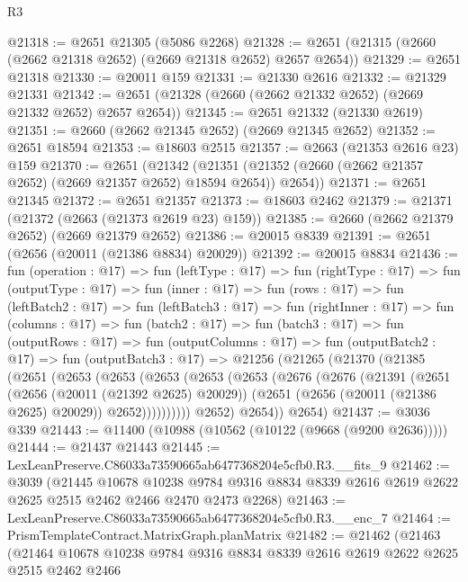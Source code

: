 \begin{lexlean}{R3}
\begin{coremodule}
@21318 := @2651 @21305 (@5086 @2268)
@21328 := @2651 (@21315 (@2660 (@2662 @21318 @2652) (@2669 @21318 @2652) @2657 @2654))
@21329 := @2651 @21318
@21330 := @20011 @159
@21331 := @21330 @2616
@21332 := @21329 @21331
@21342 := @2651 (@21328 (@2660 (@2662 @21332 @2652) (@2669 @21332 @2652) @2657 @2654))
@21345 := @2651 @21332 (@21330 @2619)
@21351 := @2660 (@2662 @21345 @2652) (@2669 @21345 @2652)
@21352 := @2651 @18594
@21353 := @18603 @2515
@21357 := @2663 (@21353 @2616 @23) @159
@21370 := @2651
    (@21342 (@21351 (@21352 (@2660 (@2662 @21357 @2652) (@2669 @21357 @2652) @18594 @2654)) @2654))
@21371 := @2651 @21345
@21372 := @2651 @21357
@21373 := @18603 @2462
@21379 := @21371 (@21372 (@2663 (@21373 @2619 @23) @159))
@21385 := @2660 (@2662 @21379 @2652) (@2669 @21379 @2652)
@21386 := @20015 @8339
@21391 := @2651 (@2656 (@20011 (@21386 @8834) @20029))
@21392 := @20015 @8834
@21436 := fun (operation : @17) =>
  fun (leftType : @17) =>
  fun (rightType : @17) =>
  fun (outputType : @17) =>
  fun (inner : @17) =>
  fun (rows : @17) =>
  fun (leftBatch2 : @17) =>
  fun (leftBatch3 : @17) =>
  fun (rightInner : @17) =>
  fun (columns : @17) =>
  fun (batch2 : @17) =>
  fun (batch3 : @17) =>
  fun (outputRows : @17) =>
  fun (outputColumns : @17) =>
  fun (outputBatch2 : @17) =>
  fun (outputBatch3 : @17) =>
  @21256
    (@21265
      (@21370
        (@21385
          (@2651
            (@2653
              (@2653
                (@2653
                  (@2653
                    (@2653
                      (@2676
                        (@2676
                          (@21391
                            (@2651
                              (@2656 (@20011 (@21392 @2625) @20029))
                              (@2651 (@2656 (@20011 (@21386 @2625) @20029)) @2652))))))))))
            @2652)
          @2654))
      @2654)
@21437 := @3036 @339
@21443 := @11400 (@10988 (@10562 (@10122 (@9668 (@9200 @2636)))))
@21444 := @21437 @21443
@21445 := LexLeanPreserve.C86033a73590665ab6477368204e5cfb0.R3.__fits_9
@21462 := @3039
    (@21445
      @10678
      @10238
      @9784
      @9316
      @8834
      @8339
      @2616
      @2619
      @2622
      @2625
      @2515
      @2462
      @2466
      @2470
      @2473
      @2268)
@21463 := LexLeanPreserve.C86033a73590665ab6477368204e5cfb0.R3.__enc_7
@21464 := PrismTemplateContract.MatrixGraph.planMatrix
@21482 := @21462
    (@21463
      (@21464
        @10678
        @10238
        @9784
        @9316
        @8834
        @8339
        @2616
        @2619
        @2622
        @2625
        @2515
        @2462
        @2466

\end{coremodule}
\end{lexlean}

